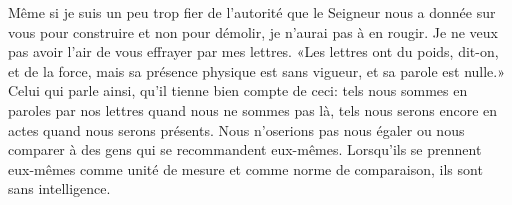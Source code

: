 Même si je suis un peu trop fier
		de l’autorité que le Seigneur nous a donnée sur vous
		pour construire et non pour démolir,
	je n’aurai pas à en rougir.
Je ne veux pas avoir l’air de vous effrayer par mes lettres.
«Les lettres ont du poids, dit-on, et de la force,
	mais sa présence physique est sans vigueur, et sa parole est nulle.»
Celui qui parle ainsi, qu’il tienne bien compte de ceci:
	tels nous sommes en paroles par nos lettres quand nous ne sommes pas là,
	tels nous serons encore en actes quand nous serons présents.
Nous n’oserions pas nous égaler
		ou nous comparer à des gens qui se recommandent eux-mêmes.
Lorsqu’ils se prennent eux-mêmes comme unité de mesure
		et comme norme de comparaison,
	ils sont sans intelligence.
